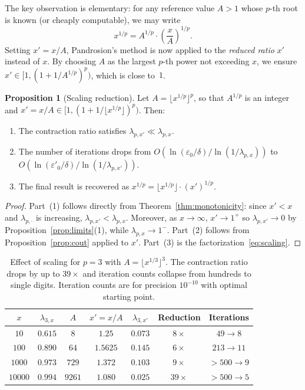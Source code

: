 \documentclass[11pt,a4paper]{article}
\theoremstyle{definition}
\newtheorem{proposition}{Proposition}[section]
\newcommand{\eps}{\varepsilon}
\begin{document}
The key observation is elementary: for any reference value $A > 1$ whose $p$-th root is known (or cheaply computable), we may write
\begin{equation}
  \label{eq:scaling}
  x^{1/p} = A^{1/p} \cdot \left(\frac{x}{A}\right)^{\!1/p}.
\end{equation}
Setting $x' = x/A$, Pandrosion's method is now applied to the \emph{reduced ratio} $x'$ instead of $x$. By choosing $A$ as the largest $p$-th power not exceeding $x$, we ensure $x' \in [1, (1+1/A^{1/p})^p)$, which is close to~$1$.

\begin{proposition}[Scaling reduction]
\label{prop:scaling}
Let $A = \lfloor x^{1/p} \rfloor^p$, so that $A^{1/p}$ is an integer and $x' = x/A \in [1, (1+1/\lfloor x^{1/p}\rfloor)^p)$. Then:
\begin{enumerate}
  \item The contraction ratio satisfies $\lambda_{p,x'} \ll \lambda_{p,x}$.
  \item The number of iterations drops from $O(\ln(\eps_0/\delta) / \ln(1/\lambda_{p,x}))$ to $O(\ln(\eps'_0/\delta) / \ln(1/\lambda_{p,x'}))$.
  \item The final result is recovered as $x^{1/p} = \lfloor x^{1/p} \rfloor \cdot (x')^{1/p}$.
\end{enumerate}
\end{proposition}

\begin{proof}
Part~(1) follows directly from Theorem~\ref{thm:monotonicity}: since $x' < x$ and $\lambda_{p,\cdot}$ is increasing, $\lambda_{p,x'} < \lambda_{p,x}$. Moreover, as $x \to \infty$, $x' \to 1^+$ so $\lambda_{p,x'} \to 0$ by Proposition~\ref{prop:limits}(1), while $\lambda_{p,x} \to 1^-$. Part~(2) follows from Proposition~\ref{prop:cout} applied to $x'$. Part~(3) is the factorization~\eqref{eq:scaling}.
\end{proof}

\begin{table}[h]
\centering
\begin{tabular}{ccccccc}
\toprule
$x$ & $\lambda_{3,x}$ & $A$ & $x' = x/A$ & $\lambda_{3,x'}$ & Reduction & Iterations \\
\midrule
$10$ & $0.615$ & $8$ & $1.25$ & $0.073$ & $8\times$ & $49 \to 8$ \\
$100$ & $0.890$ & $64$ & $1.5625$ & $0.145$ & $6\times$ & $213 \to 11$\\
$1000$ & $0.973$ & $729$ & $1.372$ & $0.103$ & $9\times$ & $>500 \to 9$ \\
$10000$ & $0.994$ & $9261$ & $1.080$ & $0.025$ & $39\times$ & $>500 \to 5$ \\
\bottomrule
\end{tabular}
\caption{Effect of scaling for $p = 3$ with $A = \lfloor x^{1/3} \rfloor^3$. The contraction ratio drops by up to $39\times$ and iteration counts collapse from hundreds to single digits. Iteration counts are for precision $10^{-10}$ with optimal starting point.}
\end{table}
\end{document}
